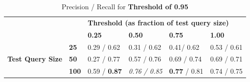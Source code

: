 \documentclass[11pt]{IEEEtran}
\begin{document}
\begin{table}[]
\centering
\caption{Precision / Recall for \textbf{Threshold of 0.95}}
\label{t95}
\begin{tabular}{ll|llll}
\cline{3-6}
                                                       &              & \multicolumn{4}{l|}{\textbf{Threshold (as fraction of test query size)}}                                                                          \\ \cline{3-6} 
\textbf{}                                              &              & \multicolumn{1}{l|}{\textbf{0.25}} & \multicolumn{1}{l|}{\textbf{0.50}} & \multicolumn{1}{l|}{\textbf{0.75}} & \multicolumn{1}{l|}{\textbf{1.00}} \\ \hline
\multicolumn{1}{|l|}{\multirow{3}{*}{\textbf{Test Query Size}}} & \textbf{25}  & 0.29 / 0.62                        & 0.31 / 0.62                         & 0.41/ 0.62                       & 0.53 / 0.61                       \\ \cline{2-2}
\multicolumn{1}{|l|}{}                                 & \textbf{50}  & 0.27 / 0.77                        & 0.57 / 0.76                         & 0.69 / 0.74                         & 0.69 / 0.71                        \\ \cline{2-2}
\multicolumn{1}{|l|}{}                                 & \textbf{100} & 0.59 / \textbf{0.87}                          & \emph{0.76 / 0.85}                    & \textbf{0.77} / 0.81                         & 0.74 / 0.75                         \\ \cline{1-2}
\end{tabular}
\end{table}
\end{document}
